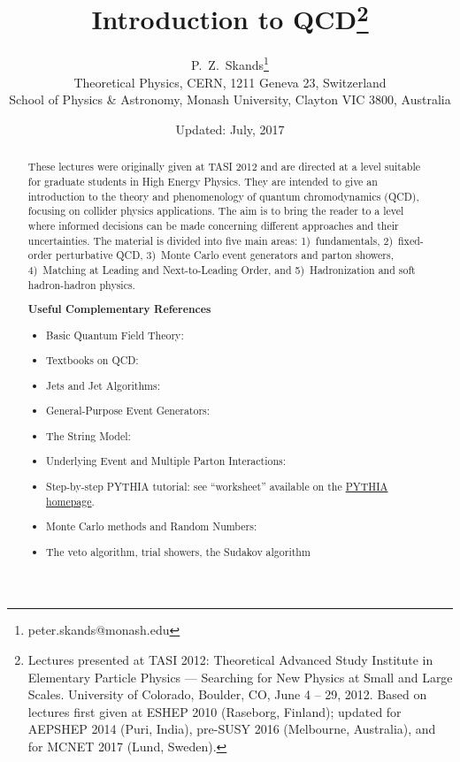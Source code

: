 \documentclass[11pt,pdf]{article}
\begin{document}
\title{Introduction to QCD\thanks
                 {Lectures presented at TASI 2012: Theoretical Advanced
 Study Institute in Elementary Particle Physics  --- Searching for
 New Physics at Small and Large Scales. University of Colorado, Boulder,
 CO, June 4 -- 29, 2012. Based on lectures first given at ESHEP 2010
 (Raseborg, Finland); updated for AEPSHEP 2014 (Puri, India), 
 pre-SUSY 2016 (Melbourne, Australia), and for MCNET 2017 (Lund, Sweden).}}
\author{P.~Z.~Skands\thanks
                 {peter.skands@monash.edu}\\[4mm]
 Theoretical Physics, CERN, 1211 Geneva 23, Switzerland\\
 School of Physics \& Astronomy, Monash University, Clayton VIC 3800, Australia\\}
\date{Updated: July, 2017}
\maketitle
\begin{abstract}
These lectures were originally given at TASI 2012 and 
are directed at a level suitable for 
graduate students in High Energy
Physics. They are intended to give an introduction to 
the theory and phenomenology of quantum  chromodynamics (QCD),
focusing on collider physics applications. The aim is to bring the
reader to a level where informed decisions can be made 
concerning different approaches and their uncertainties. 
The material is divided into five main
areas:  1)~fundamentals, 2)~fixed-order perturbative QCD, 
3)~Monte Carlo event generators and parton showers, 4)~Matching at
Leading and Next-to-Leading Order, and 5)~Hadronization and soft
hadron-hadron physics.
\vspace*{1cm}
\begin{center}
{\bf Useful Complementary References}\\[2mm]
\begin{itemize}
\item Basic Quantum Field Theory: \cite{Peskin:1995ev}
\item Textbooks on QCD: \cite{Field:1989uq,Ellis:1991qj,Dissertori:2003pj}
\item Jets and Jet Algorithms: \cite{Salam:2010zt}
\item General-Purpose Event Generators: \cite{Buckley:2011ms}
\item The String Model: \cite{Andersson:1983ia,Andersson:1998tv}
\item Underlying Event and Multiple Parton Interactions: \cite{Sjostrand:1987su,Sjostrand:2017cdm}
\item Step-by-step PYTHIA tutorial: see ``worksheet'' available on the \href{http://home.thep.lu.se/Pythia/}{PYTHIA homepage}.
\item Monte Carlo methods and Random Numbers:
  \cite{James:1980yn,Weinzierl:2000wd}
\item The veto algorithm, trial showers, the Sudakov algorithm~\cite{Platzer:2011dq,Lonnblad:2012hz,Mrenna:2016sih}
\end{itemize}
\end{center}
\end{abstract}
\end{document}
